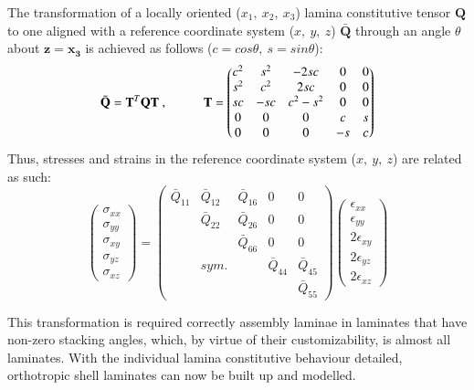 The transformation of a locally oriented ($x_1,\ x_2,\ x_3$) lamina constitutive tensor $\mathbf{Q}$ to one aligned with a reference coordinate system ($x,\ y,\ z$) $\bar{\mathbf{Q}}$ through an angle $\theta$ about $\mathbf{z}=\mathbf{x_3}$ is achieved as follows ($c = cos\theta,\ s = sin\theta$):
\begin{equation} 
\bar{\mathbf{Q}} = \mathbf{T}^T \mathbf{Q} \mathbf{T}\ ,
\hspace{10mm}
\mathbf{T} =
\begin{pmatrix}
c^2 & s^2 & -2sc & 0 & 0 \\
s^2 & c^2 & 2sc & 0 & 0 \\
sc & -sc & c^2 - s^2 & 0 & 0 \\
0 & 0 & 0 & c & s \\
 0 & 0 & 0 & -s & c
\end{pmatrix}
\label{eqscomp11}
\end{equation}
Thus, stresses and strains in the reference coordinate system  ($x,\ y,\ z$) are related as such:
\begin{equation} 
\begin{pmatrix}
\sigma_{xx} \\
\sigma_{yy} \\
\sigma_{xy} \\
\sigma_{yz} \\
\sigma_{xz} 
\end{pmatrix}
=
\begin{pmatrix}
\bar{Q}_{11} & \bar{Q}_{12} &  \bar{Q}_{16} & 0 & 0 \\
\  & \bar{Q}_{22} &  \bar{Q}_{26} & 0 & 0 \\
\  & \  & \bar{Q}_{66}  & 0 & 0 \\
\  & sym. & \  & \bar{Q}_{44} & \bar{Q}_{45} \\
\  & \  & \  & \ & \bar{Q}_{55}
\end{pmatrix}
\begin{pmatrix}
\epsilon_{xx} \\
\epsilon_{yy} \\
2\epsilon_{xy}\\
2\epsilon_{yz} \\
2\epsilon_{xz}
\end{pmatrix}
\label{eqscomp_plane_stress_tensor_rotated}
\end{equation}

This transformation is required correctly assembly laminae in laminates that have non-zero stacking angles, which, by virtue of their customizability, is almost all laminates. With the individual lamina constitutive behaviour detailed, orthotropic shell laminates can now be built up and modelled.

